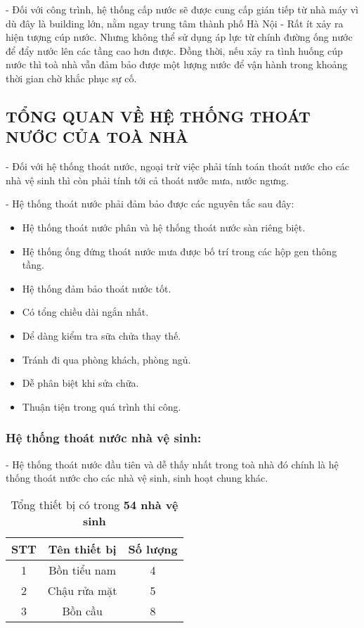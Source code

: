 		- Đối với công trình, hệ thống cấp nước sẽ được cung cấp gián tiếp từ nhà máy vì dù đây là building lớn, nằm ngay trung tâm thành phố Hà Nội - Rất ít xảy ra hiện tượng cúp nước. Nhưng không thể sử dụng áp lực từ chính đường ống nước để đẩy nước lên các tầng cao hơn được. Đồng thời, nếu xảy ra tình huống cúp nước thì toà nhà vẫn đảm bảo được một lượng nước để vận hành trong khoảng thời gian chờ khắc phục sự cố.
		
	\subsection{TỔNG QUAN VỀ HỆ THỐNG THOÁT NƯỚC CỦA TOÀ NHÀ}
	- Đối với hệ thống thoát nước, ngoại trừ việc phải tính toán thoát nước cho các nhà vệ sinh thì còn phải tính tới cả thoát nước mưa, nước ngưng.
	
	- Hệ thống thoát nước phải đảm bảo được các nguyên tắc sau đây:
	\begin{itemize}
		\setlength\itemsep{1mm}
		\item Hệ thống thoát nước phân và hệ thống thoát nước sàn riêng biệt. 
		\item Hệ thống ống đứng thoát nước mưa được bố trí trong các hộp gen thông tầng.
		\item Hệ thống đảm bảo thoát nước tốt. 
		\item Có tổng chiều dài ngắn nhất. 
		\item Dể dàng kiểm tra sữa chửa thay thế. 
		\item Tránh đi qua phòng khách, phòng ngủ. 
		\item Dễ phân biệt khi sửa chữa. 
		\item Thuận tiện trong quá trình thi công. 
	\end{itemize}
	\subsubsection{Hệ thống thoát nước nhà vệ sinh:}	
	- Hệ thống thoát nước đầu tiên và dễ thấy nhất trong toà nhà đó chính là hệ thống thoát nước cho các nhà vệ sinh, sinh hoạt chung khác.
	
\begin{table}[H]
		\vspace{-0.5cm}
  		\centering
  		\caption{Tổng thiết bị có trong \textbf{54 nhà vệ sinh}}
    	\begin{tabular}{|c|c|c|}
    	\hline
    	\multicolumn{1}{|c|}{\textbf{STT}} & \multicolumn{1}{c|}{\textbf{Tên thiết bị}} & \multicolumn{1}{c|}{\textbf{Số lượng}} \\
    	\hline
    	1     & Bồn tiểu nam & 4 \\
    	\hline
    	2     & Chậu rửa mặt & 5 \\
    	\hline
    	3     & Bồn cầu & 8 \\
   	 	\hline
    	\end{tabular}%
  		\label{tab:tong_thoat_nvs}
\end{table}
	 
